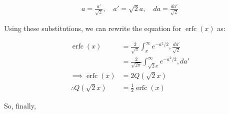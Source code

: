 \documentclass[12pt]{book}
\begin{document}
\begin{enumerate}
\begin{align}
a = \frac{a'}{\sqrt{2}},\quad a' = \sqrt{2}a ,\quad
da = \frac{da'}{\sqrt{2}}
\end{align}

Using these substitutions, we can rewrite the equation for $\operatorname{erfc} (x)$ as:

\begin{align}
\operatorname{erfc} (x) &= {\frac {2}{\sqrt {\pi }}}\int _{x}^{\infty }e^{-a^{2}/2},\frac{da'}{\sqrt{2}} \\
&= {\frac {2}{\sqrt {2\pi }}}\int _{\sqrt{2}x}^{\infty }e^{-a^{2}/2},da'\\
\implies \operatorname{erfc} (x) &= 2Q(\sqrt{2}x)\\
\therefore Q(\sqrt{2}x) &= \frac{1}{2}\operatorname{erfc} (x)
\end{align}

So, finally,


\end{enumerate}
\end{document}
